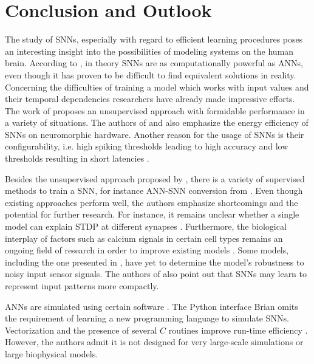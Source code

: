 \section{Conclusion and Outlook}
\label{sec:conclusion}

The study of \acp{SNN}, especially with regard to efficient learning procedures poses an interesting insight into the possibilities of modeling
systems on the human brain.
According to \cite{ANN_SNN_conversion}, in theory \acp{SNN} are as computationally powerful as \acp{ANN}, 
even though it has proven to be difficult to find equivalent solutions in reality.
Concerning the difficulties of training a model which works with input values and their temporal dependencies researchers have already made 
impressive efforts.
The work of \cite{SNN} proposes an unsupervised approach with formidable performance in a variety of situations.
The authors of \cite{SNN} and \cite{Synaptic_plasticity} also emphasize the energy efficiency of \acp{SNN} on neuromorphic hardware.
Another reason for the usage of \acp{SNN} is their configurability, 
i.e. high spiking thresholds leading to high accuracy and low thresholds resulting in short latencies \cite{ANN_SNN_conversion}.

Besides the unsupervised approach proposed by \cite{SNN}, there is a variety of supervised methods to train a \ac{SNN}, 
for instance \ac{ANN}-\ac{SNN} conversion from \cite{DIET_SNN}.
Even though existing approaches perform well, the authors emphasize shortcomings and the potential for further research.
For instance, it remains unclear whether a single model can explain \ac{STDP} at different synapses \cite{STDP_hebbian}.
Furthermore, the biological interplay of factors such as calcium signals in certain cell types remains an ongoing field of research 
in order to improve existing models \cite{STDP_hebbian}.
Some models, including the one presented in \cite{object_detection_SNN}, have yet to determine the model's robustness to noisy input sensor signals.
The authors of \cite{object_detection_SNN} also point out that \acp{SNN} may learn to represent input patterns more compactly.

\Acp{ANN} are simulated using certain software \cite{simulation_Brian}.
The Python interface Brian omits the requirement of learning a new programming language to simulate \acp{SNN}.
Vectorization and the presence of several $C$ routines improve run-time efficiency \cite{simulation_Brian}.
However, the authors admit it is not designed for very large-scale simulations or large biophysical models.

